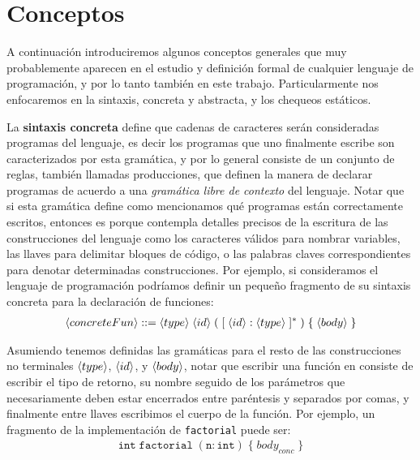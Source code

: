 \section{Conceptos}

\iffalse
son estáticos porque no hace falta tener definida una noción de evaluación para su definición
La sintaxis concreta define exactamente que cadenas de caracteres serán consideradas programas del lenguaje y por lo general consiste de un conjunto de reglas, también llamadas producciones, que definen la manera de declarar programas de acuerdo a una gramática libre de contexto del lenguaje.
podes hacer notar que para definir la semántica estática del lenguaje no hace falta tener una "versión" tan pedante y nos alcanza con enfocarnos en lo importante, y acá presentas la sintaxis abstracta
\fi

A continuación introduciremos algunos conceptos generales que muy probablemente aparecen en el estudio y definición formal de cualquier lenguaje de programación, y por lo tanto también en este trabajo.
Particularmente nos enfocaremos en la sintaxis, concreta y abstracta, y los chequeos estáticos.

La \textbf{sintaxis concreta} define que cadenas de caracteres serán consideradas programas del lenguaje, es decir los programas que uno finalmente escribe son caracterizados por esta gramática, y por lo general consiste de un conjunto de reglas, también llamadas producciones, que definen la manera de declarar programas de acuerdo a una \textit{gramática libre de contexto} del lenguaje.
Notar que si esta gramática define como mencionamos qué programas están correctamente escritos, entonces es porque contempla detalles precisos de la escritura de las construcciones del lenguaje como los caracteres válidos para nombrar variables, las llaves para delimitar bloques de código, o las palabras claves correspondientes para denotar determinadas construcciones.
Por ejemplo, si consideramos el lenguaje de programación \C{} podríamos definir un pequeño fragmento de su sintaxis concreta para la declaración de funciones:
\begin{gather*}
\langle concreteFun \rangle ::= \langle type \rangle \; \langle id \rangle \; ( \; [ \; \langle id \rangle : \langle type \rangle \; ]^* \; ) \; \{ \; \langle body \rangle \; \}
\end{gather*}

Asumiendo tenemos definidas las gramáticas para el resto de las construcciones no terminales $\langle type \rangle$, $\langle id \rangle$, y $\langle body \rangle$, notar que escribir una función en \C{} consiste de escribir el tipo de retorno, su nombre seguido de los parámetros que necesariamente deben estar encerrados entre paréntesis y separados por comas, y finalmente entre llaves escribimos el cuerpo de la función.
Por ejemplo, un fragmento de la implementación de \texttt{factorial} puede ser:
\begin{gather*}
\texttt{int} \; \texttt{factorial} \; ( \texttt{n} : \texttt{int} ) \; \{ \; body_{conc} \; \}
\end{gather*}

